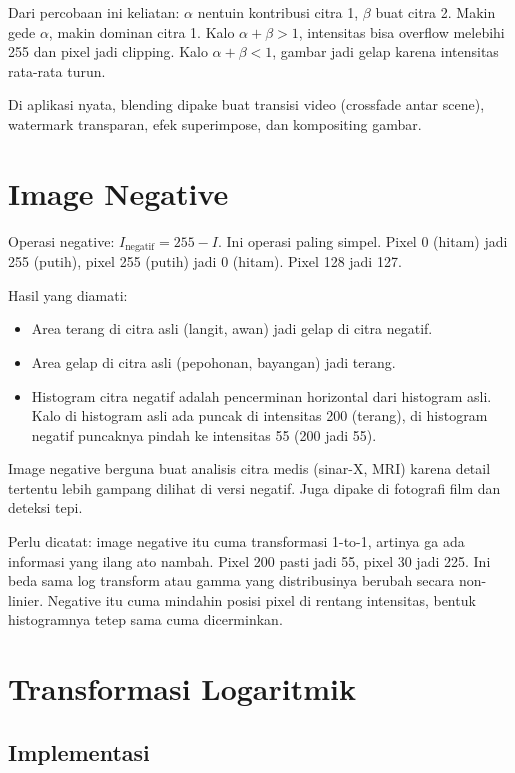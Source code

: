 \documentclass[11pt,a4paper]{article}
\begin{document}
Dari percobaan ini keliatan: $\alpha$ nentuin kontribusi citra 1, $\beta$ buat citra 2. Makin gede $\alpha$, makin dominan citra 1. Kalo $\alpha + \beta > 1$, intensitas bisa overflow melebihi 255 dan pixel jadi clipping. Kalo $\alpha + \beta < 1$, gambar jadi gelap karena intensitas rata-rata turun.

Di aplikasi nyata, blending dipake buat transisi video (crossfade antar scene), watermark transparan, efek superimpose, dan kompositing gambar.

\section{Image Negative}

Operasi negative: $I_{\text{negatif}} = 255 - I$. Ini operasi paling simpel. Pixel 0 (hitam) jadi 255 (putih), pixel 255 (putih) jadi 0 (hitam). Pixel 128 jadi 127.

Hasil yang diamati:
\begin{itemize}
    \item Area terang di citra asli (langit, awan) jadi gelap di citra negatif.
    \item Area gelap di citra asli (pepohonan, bayangan) jadi terang.
    \item Histogram citra negatif adalah pencerminan horizontal dari histogram asli. Kalo di histogram asli ada puncak di intensitas 200 (terang), di histogram negatif puncaknya pindah ke intensitas 55 (200 jadi 55).
\end{itemize}

Image negative berguna buat analisis citra medis (sinar-X, MRI) karena detail tertentu lebih gampang dilihat di versi negatif. Juga dipake di fotografi film dan deteksi tepi.

Perlu dicatat: image negative itu cuma transformasi 1-to-1, artinya ga ada informasi yang ilang ato nambah. Pixel 200 pasti jadi 55, pixel 30 jadi 225. Ini beda sama log transform atau gamma yang distribusinya berubah secara non-linier. Negative itu cuma mindahin posisi pixel di rentang intensitas, bentuk histogramnya tetep sama cuma dicerminkan.

\section{Transformasi Logaritmik}

\subsection{Implementasi}
\end{document}
